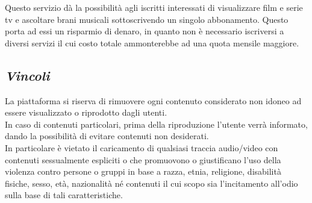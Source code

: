 Questo servizio dà la possibilità agli iscritti interessati di visualizzare film e serie tv e ascoltare brani musicali sottoscrivendo un singolo abbonamento. Questo porta ad essi un risparmio di denaro, in quanto non è necessario iscriversi a diversi servizi il cui costo totale ammonterebbe ad una quota mensile maggiore.

\subsection{\itshape{Vincoli}}
La piattaforma si riserva di rimuovere ogni contenuto considerato non idoneo ad essere visualizzato o riprodotto dagli utenti.\\
In caso di contenuti particolari, prima della riproduzione l'utente verrà informato, dando la possibilità di evitare contenuti non desiderati.\\
In particolare è vietato il caricamento di qualsiasi traccia audio/video con contenuti sessualmente espliciti o che promuovono o giustificano l'uso della violenza contro persone o gruppi in base a razza, etnia, religione, disabilità fisiche, sesso, età, nazionalità né contenuti il cui scopo sia l'incitamento all'odio sulla base di tali caratteristiche.
